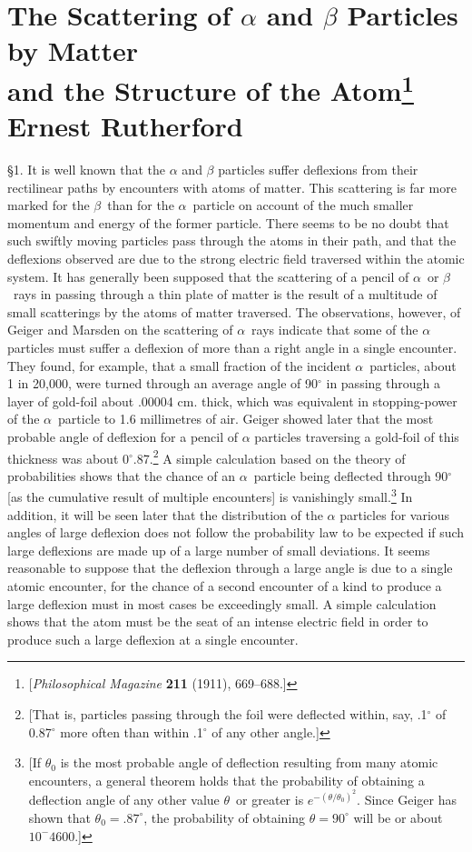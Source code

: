 \section*{The Scattering of $\alpha$ and $\beta$ Particles by Matter\\
  and the Structure of the Atom\footnote{{[}\emph{Philosophical Magazine}
  \textbf{211} (1911), 669--688.{]}}\\
  {\large Ernest Rutherford}}



\S1. It is well known that the $\alpha$ and $\beta$ particles suffer
deflexions from their rectilinear paths by encounters with atoms of
matter. This scattering is far more marked for the $\beta$~than for the
$\alpha$~particle on account of the much smaller momentum and energy of
the former particle. There seems to be no doubt that such swiftly moving
particles pass through the atoms in their path, and that the deflexions
observed are due to the strong electric field traversed within the
atomic system. It has generally been supposed that the scattering of a
pencil of $\alpha$~or $\beta$~rays in passing through a thin plate of
matter is the result of a multitude of small scatterings by the atoms of
matter traversed. The observations, however, of Geiger and Marsden on
the scattering of $\alpha$~rays indicate that some of the $\alpha$
particles must suffer a deflexion of more than a right angle in a single
encounter. They found, for example, that a small fraction of the
incident $\alpha$~particles, about 1 in 20,000, were turned through an
average angle of 90$^\circ$ in passing through a layer of gold-foil about
.00004 cm. thick, which was equivalent in stopping-power of the
$\alpha$~particle to 1.6 millimetres of air. Geiger showed later that
the most probable angle of deflexion for a pencil of $\alpha$ particles
traversing a gold-foil of this thickness was about 0$^\circ$.87.\footnote{{[}That
  is, particles passing through the foil were deflected within, say, .1$^\circ$
  of 0.87$^\circ$ more often than within .1$^\circ$ of any other angle.{]}} A simple
calculation based on the theory of probabilities shows that the chance
of an $\alpha$~particle being deflected through 90$^\circ$ {[}as the cumulative
result of multiple encounters{]} is vanishingly small.\footnote{{[}If
  $\theta_0$ is the most probable angle of deflection resulting from many
  atomic encounters, a general theorem holds that the probability of
  obtaining a deflection angle of any other value $\theta$~or greater is
  $e^{-(\theta/\theta_0)^2}$. Since Geiger has shown that $\theta_0 = .87^{\circ}$, the probability of
  obtaining $\theta = 90^\circ$ will be or about $10^-{4600}$.{]}} In addition, it
will be seen later that the distribution of the $\alpha$ particles for
various angles of large deflexion does not follow the probability law to
be expected if such large deflexions are made up of a large number of
small deviations. It seems reasonable to suppose that the deflexion
through a large angle is due to a single atomic encounter, for the
chance of a second encounter of a kind to produce a large deflexion must
in most cases be exceedingly small. A simple calculation shows that the
atom must be the seat of an intense electric field in order to produce
such a large deflexion at a single encounter.

